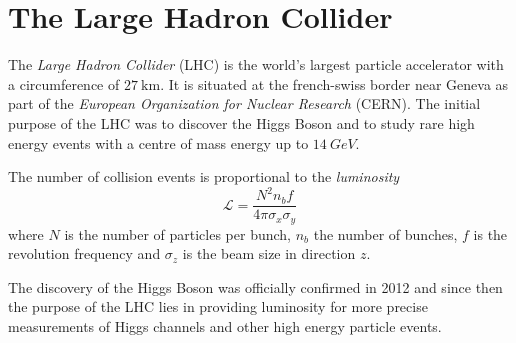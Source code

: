 \section{The Large Hadron Collider}

The \emph{Large Hadron Collider} (LHC) is the world's largest particle accelerator with a circumference
of $\SI{27}{\kilo\meter}$. It is situated at the french-swiss border near Geneva as part of the
\emph{European Organization for Nuclear Research} (CERN).
The initial purpose of the LHC was to discover the Higgs Boson and to study rare high energy events 
with a centre of mass energy up to $\SI{14}{GeV}$.

The number of collision events is proportional to the \emph{luminosity}
%
\begin{equation}
    \mathscr{L} = \frac{N^2 n_b f}{4\pi\sigma_x\sigma_y}
\end{equation}
%
where $N$ is the number of particles per bunch, $n_b$ the number of bunches, $f$ is
the revolution frequency and $\sigma_z$ is the beam size in direction $z$.

The discovery of the Higgs Boson was officially confirmed in 2012 \cite{higgs} and since then the
purpose of the LHC lies in providing luminosity for more precise measurements of Higgs channels and
other high energy particle events. 

